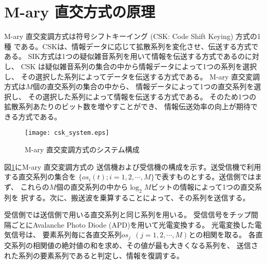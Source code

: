 \section{M-ary 直交方式の原理}
M-ary 直交変調方式は符号シフトキーイング (CSK: Code Shift Keying) 方式\cite{csk1}\cite{csk2}の1種
である。CSKは、情報データに応じて拡散系列を変化させ、伝送する方式である。
SIK方式は1つの疑似雑音系列を用いて情報を伝送する方式であるのに対し、
CSK は疑似雑音系列の集合の中から情報データによって1つの系列を選択し、
その選択した系列によってデータを伝送する方式である。
M-ary 直交変調方式は$M$個の直交系列の集合の中から、
情報データによって1つの直交系列を選択し、
その選択した系列によって情報を伝送する方式である。
そのため1つの拡散系列あたりのビット数を増やすことができ、
情報伝送効率の向上が期待できる方式である。
%
\begin{figure}[hpbt]
\begin{center}
  \texttt{[image: csk\_system.eps]}
\caption{M-ary 直交変調方式のシステム構成}
\label{csk_system}
\end{center}
\end{figure}
%
図\ref{csk_system}にM-ary 直交変調方式の
送信機および受信機の構成を示す。送受信機で利用する直交系列の集合を
$\{os_i(t); i=1, 2, \cdots, M\}$で表すものとする。送信側ではまず、
これらの$M$個の直交系列の中から$\log_2 M$ビットの情報によって1つの直交系列を
択する。次に、搬送波を乗算することによって、その系列を送信する。

受信側では送信側で用いる直交系列と同じ系列を用いる。
受信信号をチップ間隔ごとにAvalanche Photo Diode (APD)を用いて光電変換する。
光電変換した電気信号は、
要素系列毎に各直交系列$os_{j}~~(j=1,2, \cdots, M)$との相関を取る。
各直交系列の相関値の絶対値の和を求め、その値が最も大きくなる系列を、
送信された系列の要素系列であると判定し、情報を復調する。

%

